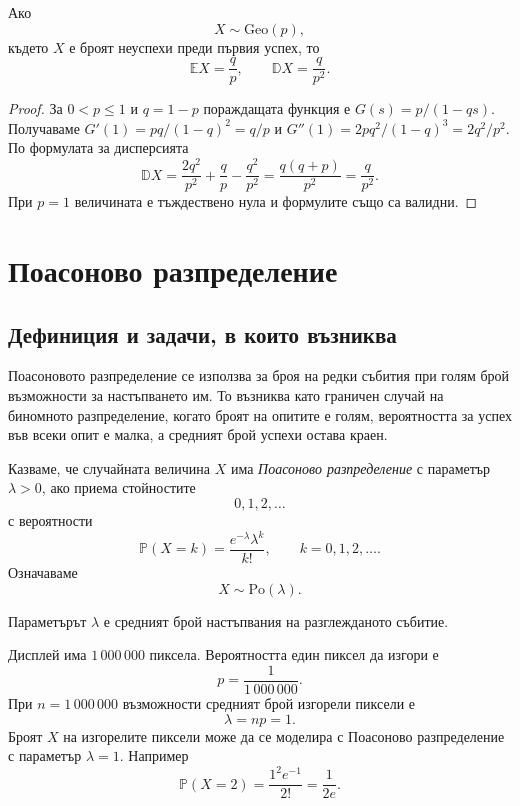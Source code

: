 \begin{keythm}
Ако
\[
X\sim\mathrm{Geo}(p),
\]
където $X$ е броят неуспехи преди първия успех, то
\[
\mathbb{E}X=\frac{q}{p},
\qquad
\mathbb{D}X=\frac{q}{p^2}.
\]
\end{keythm}

\begin{proof}
За $0<p\le1$ и $q=1-p$ пораждащата функция е $G(s)=p/(1-qs)$. Получаваме $G'(1)=pq/(1-q)^2=q/p$ и $G''(1)=2pq^2/(1-q)^3=2q^2/p^2$. По формулата за дисперсията
\[\mathbb D X=\frac{2q^2}{p^2}+\frac qp-\frac{q^2}{p^2}=\frac{q(q+p)}{p^2}=\frac q{p^2}.\]
При $p=1$ величината е тъждествено нула и формулите също са валидни.
\end{proof}

\section{Поасоново разпределение}\label{s:35.5}

\subsection{Дефиниция и задачи, в които възниква}\label{s:35.5.1}

Поасоновото разпределение се използва за броя на редки събития при голям брой възможности за настъпването им. То възниква като граничен случай на биномното разпределение, когато броят на опитите е голям, вероятността за успех във всеки опит е малка, а средният брой успехи остава краен.

\begin{defn}
Казваме, че случайната величина $X$ има \emph{Поасоново разпределение} с параметър $\lambda>0$, ако приема стойностите
\[
0,1,2,\ldots
\]
с вероятности
\[
\mathbb{P}(X=k)=\frac{e^{-\lambda}\lambda^k}{k!},
\qquad k=0,1,2,\ldots .
\]
Означаваме
\[
X\sim\mathrm{Po}(\lambda).
\]
\end{defn}

Параметърът $\lambda$ е средният брой настъпвания на разглежданото събитие.

\begin{example}
Дисплей има $1\,000\,000$ пиксела. Вероятността един пиксел да изгори е
\[
p=\frac{1}{1\,000\,000}.
\]
При $n=1\,000\,000$ възможности средният брой изгорели пиксели е
\[
\lambda=np=1.
\]
Броят $X$ на изгорелите пиксели може да се моделира с Поасоново разпределение с параметър $\lambda=1$. Например
\[
\mathbb{P}(X=2)
=
\frac{1^2e^{-1}}{2!}
=
\frac{1}{2e}.
\]
\end{example}

